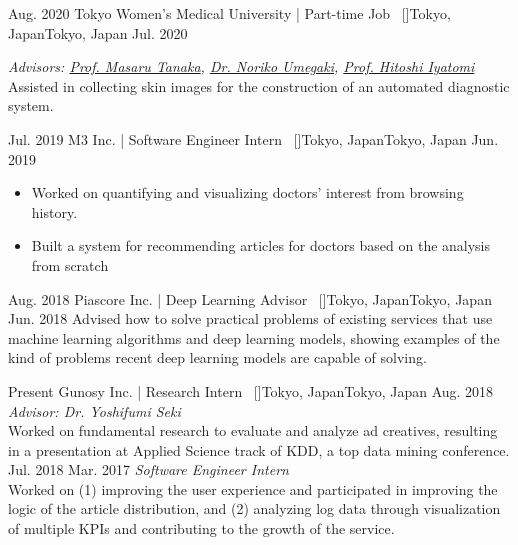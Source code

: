 \begin{experiences}
    \emptySeparator
    \researchexperience
    {Aug. 2020}   {Tokyo Women's Medical University | Part-time Job{\normalfont  ~ [\href{https://www.twmu.ac.jp/english/}{\small{\websiteSymbol}}]}}{Tokyo, Japan}{Tokyo, Japan}
    {Jul. 2020} {
    \textit{Advisors: \href{https://www.researchgate.net/scientific-contributions/Masaru-Tanaka-2078765174}{Prof. Masaru Tanaka}, \href{https://researchmap.jp/7000025183?lang=en}{Dr. Noriko Umegaki}, \href{https://scholar.google.com/citations?user=ghyQxvIAAAAJ}{Prof. Hitoshi Iyatomi}}\\
    Assisted in collecting skin images for the construction of an automated diagnostic system.

    }

    \emptySeparator
    \researchexperience
    {Jul. 2019}   {M3 Inc. | Software Engineer Intern{\normalfont  ~ [\href{https://corporate.m3.com/en/}{\small{\websiteSymbol}}]}}{Tokyo, Japan}{Tokyo, Japan}
    {Jun. 2019} {
    \begin{itemize}
        \item Worked on quantifying and visualizing doctors' interest from browsing history.
        \item Built a system for recommending articles for doctors based on the analysis from scratch
    \end{itemize}
    }

    \emptySeparator
    \researchexperience
    {Aug. 2018}   {Piascore Inc. | Deep Learning Advisor{\normalfont  ~ [\href{http://piascore.com/en/}{\small{\websiteSymbol}}]}}{Tokyo, Japan}{Tokyo, Japan}
    {Jun. 2018} {
    Advised how to solve practical problems of existing services that use machine learning algorithms and deep learning models, showing examples of the kind of problems recent deep learning models are capable of solving.
    }

    \emptySeparator
    \researchexperience
    {Present}   {Gunosy Inc. | Research Intern{\normalfont  ~ [\href{https://gunosy.co.jp/en/}{\small{\websiteSymbol}}]}}{Tokyo, Japan}{Tokyo, Japan}
    {Aug. 2018} {\textit{Advisor: Dr. Yoshifumi Seki}\\
    Worked on fundamental research to evaluate and analyze ad creatives, resulting in a presentation at Applied Science track of KDD, a top data mining conference.
    \vskip 0.1cm
    }
    \researchexperience
    {Jul. 2018}   {}{}{}
    {Mar. 2017} {\textit{Software Engineer Intern}\\
        Worked on (1) improving the user experience and participated in improving the logic of the article distribution, and (2) analyzing log data through visualization of multiple KPIs and contributing to the growth of the service.
    }


\end{experiences}
